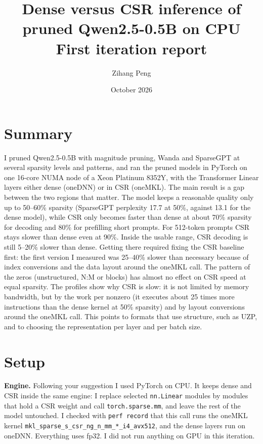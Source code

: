 \documentclass[11pt,a4paper]{article}
\title{Dense versus CSR inference of pruned Qwen2.5-0.5B on CPU\\[0.3em]
\large First iteration report}
\author{Zihang Peng}
\date{October 2026}
\begin{document}
\maketitle

\section*{Summary}

I pruned Qwen2.5-0.5B with magnitude pruning, Wanda and SparseGPT at
several sparsity levels and patterns, and ran the pruned models in PyTorch
on one 16-core NUMA node of a Xeon Platinum 8352Y, with the Transformer
Linear layers either dense (oneDNN) or in CSR (oneMKL). The main result is
a gap between the two regions that matter. The model keeps a reasonable
quality only up to 50--60\% sparsity (SparseGPT perplexity 17.7 at 50\%,
against 13.1 for the dense model), while CSR only becomes faster than dense
at about 70\% sparsity for decoding and 80\% for prefilling short prompts.
For 512-token prompts CSR stays slower than dense even at 90\%. Inside the
usable range, CSR decoding is still 5--20\% slower than dense. Getting there required fixing the CSR baseline first: the
first version I measured was 25--40\% slower than necessary because of index
conversions and the data layout around the oneMKL call. The pattern of the
zeros (unstructured, N:M or blocks) has almost no effect on CSR speed at
equal sparsity. The profiles show why CSR is slow: it is not limited by
memory bandwidth, but by the work per nonzero (it executes about 25 times
more instructions than the dense kernel at 50\% sparsity) and by layout
conversions around the oneMKL call. This points to formats that use structure, such as
UZP, and to choosing the representation per layer and per batch size.

\section{Setup}

\textbf{Engine.} Following your suggestion I used PyTorch on CPU. It keeps
dense and CSR inside the same engine: I replace selected \texttt{nn.Linear}
modules by modules that hold a CSR weight and call
\texttt{torch.sparse.mm}, and leave the rest of the model untouched. I
checked with \texttt{perf record} that this call runs the oneMKL kernel
\texttt{mkl\_sparse\_s\_csr\_ng\_n\_mm\_*\_i4\_avx512}, and the dense
layers run on oneDNN. Everything uses fp32. I did not run anything on GPU
in this iteration.
\end{document}
